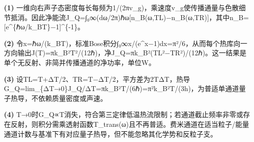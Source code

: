 \par\noindent\textbf{(1)} 一维向右声子态密度每长每频为1/(2πv\_g)，乘速度v\_g使传播通量与色散细节抵消。因此净能流J\_Q=∫₀∞(dω/2π)ℏω[n\_B(ω,TL)−n\_B(ω,TR)]，其中n\_B=[e\textasciicircum{}\{ℏω/k\_BT\}−1]\textasciicircum{}\{-1\}。
\par\noindent\textbf{(2)} 令x=ℏω/(k\_BT)，标准Bose积分∫₀∞x/(e\textasciicircum{}x−1)dx=π²/6，从而每个热库向一方向输出J(T)=πk\_B²T²/(12ℏ)，净J\_Q=πk\_B²(TL²−TR²)/(12ℏ)。这一结果是单个无反射、非简并传播通道的净功率，单位W。
\par\noindent\textbf{(3)} 设TL=T+ΔT/2、TR=T−ΔT/2，平方差为2TΔT，热导G\_Q=lim\_\{ΔT→0\}J\_Q/ΔT=πk\_B²T/(6ℏ)=π²k\_B²T/(3h)，为普适单通道量子热导，不依赖质量密度或声速。
\par\noindent\textbf{(4)} T→0时G\_Q∝T消失，符合第三定律低温热流限制；若通道截止频率非零或存在反射，则积分需乘透射函数T\_trans(ω)且不再普适。费米通道在适当粒子/能量通道计数与基准下有对应量子热导，但不能忽略其化学势和反粒子支。
